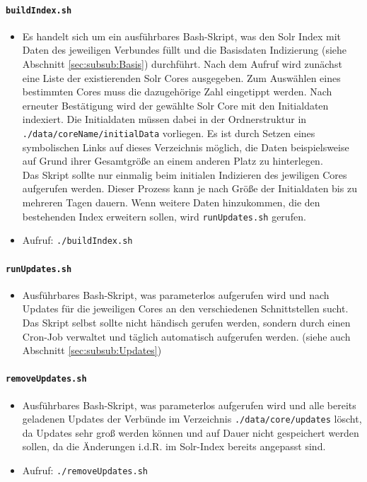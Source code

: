 \documentclass[10pt]{article}
\begin{document}
\paragraph{\texttt{buildIndex.sh}}
\label{sec:para:buildIndex}
\begin{itemize}
	\item Es handelt sich um ein ausführbares Bash-Skript, was den Solr Index mit Daten des jeweiligen Verbundes füllt und die Basisdaten Indizierung (siehe Abschnitt \ref{sec:subsub:Basis}) durchführt. Nach dem Aufruf wird zunächst eine Liste der existierenden Solr Cores ausgegeben. Zum Auswählen eines bestimmten Cores muss die dazugehörige Zahl eingetippt werden. Nach erneuter Bestätigung wird der gewählte Solr Core mit den Initialdaten indexiert. Die Initialdaten müssen dabei in der Ordnerstruktur in \texttt{./data/coreName/initialData} vorliegen. Es ist durch Setzen eines symbolischen Links auf dieses Verzeichnis möglich, die Daten beispielsweise auf Grund ihrer Gesamtgröße an einem anderen Platz zu hinterlegen. \\
	Das Skript sollte nur einmalig beim initialen Indizieren des jewiligen Cores aufgerufen werden. Dieser Prozess kann je nach Größe der Initialdaten bis zu mehreren Tagen dauern. Wenn weitere Daten hinzukommen, die den bestehenden Index erweitern sollen, wird \texttt{runUpdates.sh} gerufen.
	\item Aufruf: \texttt{./buildIndex.sh}
\end{itemize}

\paragraph{\texttt{runUpdates.sh}}
\label{sec:para:runUpdates}
\begin{itemize}
	\item Ausführbares Bash-Skript, was parameterlos aufgerufen wird und nach Updates für die jeweiligen Cores an den verschiedenen Schnittstellen sucht. Das Skript selbst sollte nicht händisch gerufen werden, sondern durch einen Cron-Job verwaltet und täglich automatisch aufgerufen werden. (siehe auch Abschnitt \ref{sec:subsub:Updates})
\end{itemize}

\paragraph{\texttt{removeUpdates.sh}}
\label{sec:para:removeUpdatesteCore}
\begin{itemize}
	\item Ausführbares Bash-Skript, was parameterlos aufgerufen wird und alle bereits geladenen Updates der Verbünde im Verzeichnis \texttt{./data/core/updates} löscht, da Updates sehr groß werden können und auf Dauer nicht gespeichert werden sollen, da die Änderungen i.d.R. im Solr-Index bereits angepasst sind.
	\item Aufruf: \texttt{./removeUpdates.sh}
\end{itemize}
\end{document}
